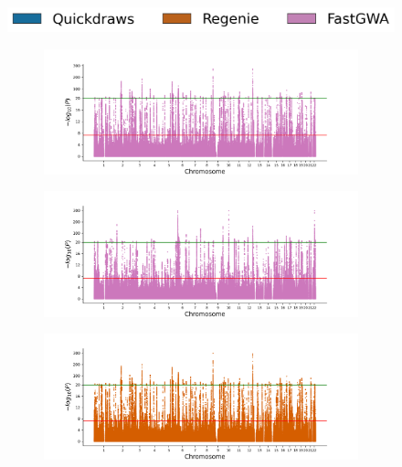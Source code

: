 \begin{figure}[h!]
    \centering
    \includegraphics[scale=0.425]{figures/manhattan_quant/legend.png}
    \begin{subfigure}{.5\textwidth}
    \includegraphics[width=\textwidth]{figures/manhattan_quant/imputed_fastgwa0.png}
    \end{subfigure}%
    \begin{subfigure}{.5\textwidth}
    \includegraphics[width=\textwidth]{figures/manhattan_quant/imputed_fastgwa3.png}
    \end{subfigure}
    \begin{subfigure}{.5\textwidth}
    \includegraphics[width=\textwidth]{figures/manhattan_quant/regenie_400k_Eosinophill_count.regenie.png}
    \end{subfigure}%
    \begin{subfigure}{.5\textwidth}

\end{subfigure}
\end{figure}
